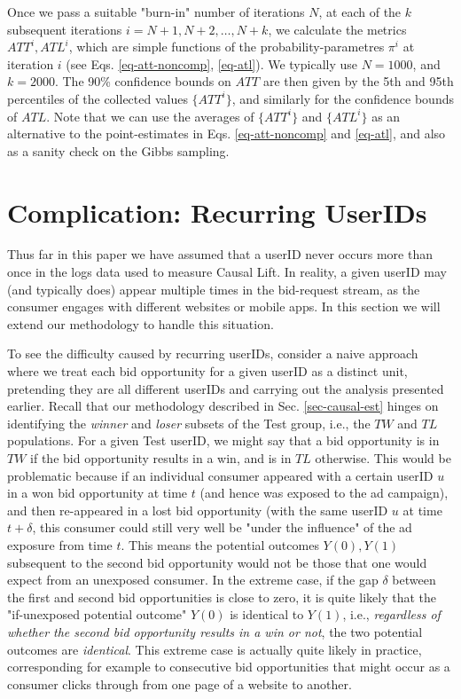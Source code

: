\documentclass[11pt,a4paper]{article}
\theoremstyle{definition}
\theoremstyle{remark}
\theoremstyle{definition}
\theoremstyle{definition}
\theoremstyle{definition}
\theoremstyle{definition}
\theoremstyle{definition}
\theoremstyle{definition}
\begin{document}
Once we pass a suitable "burn-in" number of iterations $N$, at each of the $k$ subsequent iterations $i = N+1, N+2,\ldots,N+k$, we calculate the metrics $ATT^i, ATL^i$, which are simple functions of the probability-parametres $\pi^i$ at iteration $i$ 
(see Eqs. \ref{eq-att-noncomp}, \ref{eq-atl}). 
We typically use $N=1000$, and $k = 2000$. The 90\% confidence bounds on $ATT$ are then given by the 5th and 95th percentiles of the collected values $\{ATT^i\}$, and similarly for the confidence bounds of $ATL$. Note that we can use the averages of $\{ATT^i\}$ and $\{ATL^i\}$ as an alternative to the point-estimates in Eqs. \ref{eq-att-noncomp} and \ref{eq-atl}, and also as a sanity check on the Gibbs sampling.



\section{Complication: Recurring UserIDs}  \label{sec-repeat}

Thus far in this paper we have assumed that a userID never occurs more than once in the logs data used to measure Causal Lift. 
In reality, a given userID may (and typically does) appear multiple times in the bid-request stream, as the consumer engages with different websites or mobile apps. In this section we will extend our methodology to handle this situation. 

To see the difficulty caused by recurring userIDs, consider a naive approach where we treat each bid opportunity for a given userID as a distinct unit, pretending they are all different userIDs and carrying out the analysis presented earlier. Recall that our methodology described in Sec. \ref{sec-causal-est} hinges on identifying the \textit{winner} and \textit{loser} subsets of the Test group, i.e., the $TW$ and $TL$ populations. 
For a given Test userID, we might say that a bid opportunity is in $TW$ if the bid opportunity results in a win, and is in $TL$ otherwise. This would be problematic because if an individual consumer appeared with a certain userID $u$ in a won bid opportunity at time $t$ (and hence was exposed to the ad campaign), and then re-appeared in a lost bid opportunity (with the same userID $u$ at time $t + \delta$, this consumer could still very well be "under the influence" of the ad exposure from time $t$.
This means the potential outcomes $Y(0), Y(1)$ subsequent to the second bid opportunity would not be those that one would expect from an unexposed consumer. 
In the extreme case, if the gap $\delta$ between the first and second bid opportunities is close to zero, it is quite likely that the "if-unexposed potential outcome" $Y(0)$ is identical to $Y(1)$, i.e., \textit{regardless of whether the second bid opportunity results in a win or not}, the two potential outcomes are \textit{identical}. This extreme case is actually quite likely in practice, corresponding for example to consecutive bid opportunities that might occur as a consumer clicks through from one page of a website to another.
\end{document}
